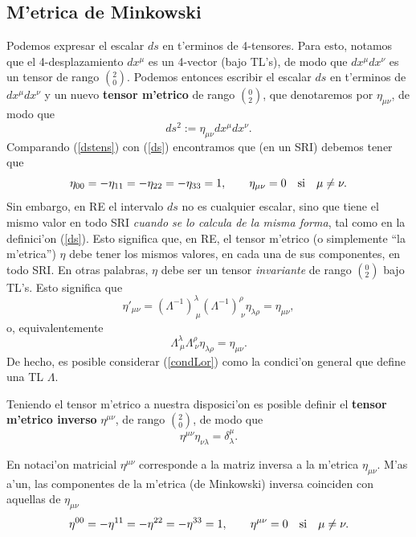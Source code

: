 \subsection{M'etrica de Minkowski}
Podemos expresar el escalar $ds$ en t'erminos de 4-tensores. Para esto, notamos
que el 4-desplazamiento $dx^\mu$ es un 4-vector (bajo TL's), de modo que
$dx^\mu dx^\nu$ es un tensor de rango $(^2_0)$. Podemos entonces escribir
el escalar $ds$ en t'erminos de $dx^\mu dx^\nu$ y un nuevo \textbf{tensor
m'etrico} de rango $(^0_2)$, que denotaremos por $\eta_{\mu\nu}$, de modo que
\begin{equation}
ds^2:=\eta_{\mu\nu}dx^\mu dx^\nu. \label{dstens}
\end{equation}
Comparando (\ref{dstens}) con (\ref{ds}) encontramos que (en un SRI)
debemos tener que
\begin{equation}
\eta_{00}=-\eta_{11}=-\eta_{22}=-\eta_{33}=1, \qquad \eta_{\mu\nu}=0
\quad\rm{si}\quad \mu\neq\nu .
\end{equation}
Sin embargo, en RE el intervalo $ds$ no es cualquier escalar, sino que tiene el mismo valor en todo SRI \textit{cuando se lo calcula de la misma forma}, tal como en la definici'on (\ref{ds}). Esto significa que, en RE, el tensor m'etrico (o simplemente ``la m'etrica'') $\eta$ debe tener los mismos valores, en cada una de sus componentes, en todo SRI. En  otras palabras, $\eta$ debe ser un tensor \textit{invariante} de rango $(^0_2)$ bajo TL's. Esto significa que
\begin{equation}
\eta'_{\mu\nu}=\left( \Lambda^{-1}\right)^{\lambda}_{\ \mu}\left(
\Lambda^{-1}\right)^{\rho}_{\ \nu}\eta_{\lambda\rho}=\eta_{\mu\nu},
\end{equation}
o, equivalentemente
\begin{equation}
\boxed{\Lambda^\lambda_{\ \mu}\Lambda^\rho_{\ \nu}\eta_{\lambda\rho}=\eta_{\mu\nu}.}
\label{condLor}
\end{equation}
De hecho, es posible considerar (\ref{condLor}) como la condici'on general que define una TL $\Lambda$.

Teniendo el tensor m'etrico a nuestra disposici'on es posible definir el \textbf{tensor m'etrico inverso} $\eta^{\mu\nu}$, de rango $(^2_0)$, de modo que
\begin{equation}
\boxed{\eta^{\mu\nu}\eta_{\nu\lambda}=\delta^\mu_\lambda .}\label{definv}
\end{equation}

En notaci'on matricial $\eta^{\mu\nu}$ corresponde a la matriz inversa a la
m'etrica $\eta_{\mu\nu}$. M'as a'un, las componentes de la m'etrica (de
Minkowski) inversa coinciden con aquellas de $\eta_{\mu\nu}$
\begin{equation}
\eta^{00}=-\eta^{11}=-\eta^{22}=-\eta^{33}=1, \qquad \eta^{\mu\nu}=0
\quad\rm{si}\quad \mu\neq\nu .
\end{equation}

